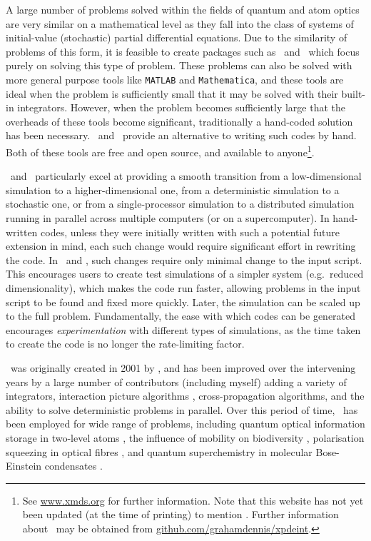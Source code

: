 A large number of problems solved within the fields of quantum and atom optics are very similar on a mathematical level as they fall into the class of systems of initial-value (stochastic) partial differential equations.  Due to the similarity of problems of this form, it is feasible to create packages such as \XMDS\ and \xpdeint\ which focus purely on solving this type of problem.  These problems can also be solved with more general purpose tools like \texttt{MATLAB} and \texttt{Mathematica}, and these tools are ideal when the problem is sufficiently small that it may be solved with their built-in integrators.  However, when the problem becomes sufficiently large that the overheads of these tools become significant, traditionally a hand-coded solution has been necessary.  \XMDS\ and \xpdeint\ provide an alternative to writing such codes by hand.  Both of these tools are free and open source, and available to anyone\footnote{See \url{www.xmds.org} for further information.  Note that this website has not yet been updated (at the time of printing) to mention \xpdeint.  Further information about \xpdeint\ may be obtained from \url{github.com/grahamdennis/xpdeint}.}.

\XMDS\ and \xpdeint\ particularly excel at providing a smooth transition from a low-dimensional simulation to a higher-dimensional one, from a deterministic simulation to a stochastic one, or from a single-processor simulation to a distributed simulation running in parallel across multiple computers (or on a supercomputer).  In hand-written codes, unless they were initially written with such a potential future extension in mind, each such change would require significant effort in rewriting the code.  In \XMDS\ and \xpdeint, such changes require only minimal change to the input script.  This encourages users to create test simulations of a simpler system (e.g.\ reduced dimensionality), which makes the code run faster, allowing problems in the input script to be found and fixed more quickly.  Later, the simulation can be scaled up to the full problem.  Fundamentally, the ease with which codes can be generated encourages \emph{experimentation} with different types of simulations, as the time taken to create the code is no longer the rate-limiting factor.

\parasep

\XMDS\ was originally created in 2001 by \citet{Collecutt:2001}, and has been improved over the intervening years by a large number of contributors (including myself) adding a variety of integrators, interaction picture algorithms \citep{Caradoc-Davies:2000qy}, cross-propagation algorithms, and the ability to solve deterministic problems in parallel.  Over this period of time, \XMDS\ has been employed for wide range of problems, including quantum optical information storage in two-level atoms \citep{Hetet:2008}, the influence of mobility on biodiversity \citep{Reichenbach:2007}, polarisation squeezing in optical fibres \citep{Corney:2006}, and quantum superchemistry in molecular Bose-Einstein condensates \citep{Hope:2001a}.  


